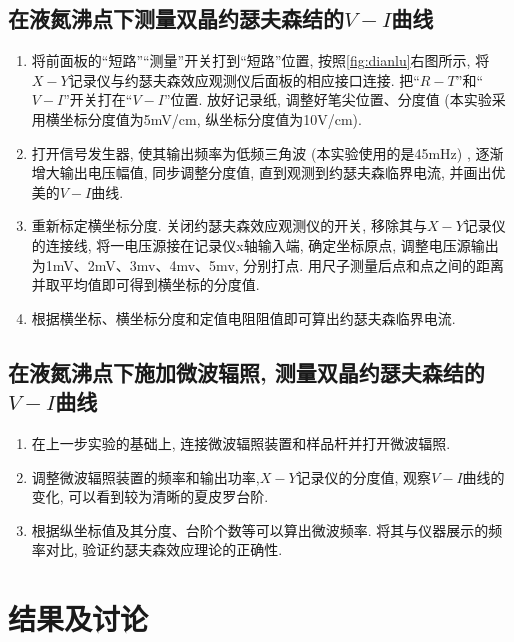 \documentclass[font=default]{mpltx}
\begin{document}
  \subsection{在液氮沸点下测量双晶约瑟夫森结的$V-I$曲线}
  \begin{enumerate}
    \item 将前面板的“短路”“测量”开关打到“短路”位置, 按照\autoref{fig:dianlu}右图所示, 将$X-Y$记录仪与约瑟夫森效应观测仪后面板的相应接口连接. 把“$R-T$”和“$V-I$”开关打在“$V-I$”位置. 放好记录纸, 调整好笔尖位置、分度值 (本实验采用横坐标分度值为5mV/cm, 纵坐标分度值为10\mu V/cm). 
    \item 打开信号发生器, 使其输出频率为低频三角波 (本实验使用的是45mHz) , 逐渐增大输出电压幅值, 同步调整分度值, 直到观测到约瑟夫森临界电流, 并画出优美的$V-I$曲线.
    \item 重新标定横坐标分度. 关闭约瑟夫森效应观测仪的开关, 移除其与$X-Y$记录仪的连接线, 将一电压源接在记录仪x轴输入端, 确定坐标原点, 调整电压源输出为1mV、2mV、3mv、4mv、5mv, 分别打点. 用尺子测量后点和点之间的距离并取平均值即可得到横坐标的分度值.
    \item 根据横坐标、横坐标分度和定值电阻阻值即可算出约瑟夫森临界电流.
    
  \end{enumerate}



  \subsection{在液氮沸点下施加微波辐照, 测量双晶约瑟夫森结的$V-I$曲线}
  \begin{enumerate}
    \item 在上一步实验的基础上, 连接微波辐照装置和样品杆并打开微波辐照.
    \item 调整微波辐照装置的频率和输出功率,$X-Y$记录仪的分度值, 观察$V-I$曲线的变化, 可以看到较为清晰的夏皮罗台阶.
    \item 根据纵坐标值及其分度、台阶个数等可以算出微波频率. 将其与仪器展示的频率对比, 验证约瑟夫森效应理论的正确性.
  \end{enumerate}


\section{结果及讨论}
\end{document}

